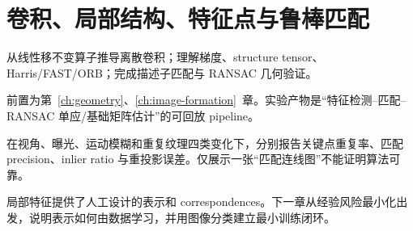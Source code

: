 \chapter{卷积、局部结构、特征点与鲁棒匹配}
\label{ch:features}

\begin{learningobjectives}
从线性移不变算子推导离散卷积；理解梯度、structure tensor、Harris/FAST/ORB；完成描述子匹配与 RANSAC 几何验证。
\end{learningobjectives}

\begin{prerequisites}
前置为第~\ref{ch:geometry}、\ref{ch:image-formation}~章。实验产物是“特征检测--匹配--RANSAC 单应/基础矩阵估计”的可回放 pipeline。
\end{prerequisites}


\begin{engineeringcheck}
在视角、曝光、运动模糊和重复纹理四类变化下，分别报告关键点重复率、匹配 precision、inlier ratio 与重投影误差。仅展示一张“匹配连线图”不能证明算法可靠。
\end{engineeringcheck}

\begin{chaptertransition}
局部特征提供了人工设计的表示和 correspondences。下一章从经验风险最小化出发，说明表示如何由数据学习，并用图像分类建立最小训练闭环。
\end{chaptertransition}

